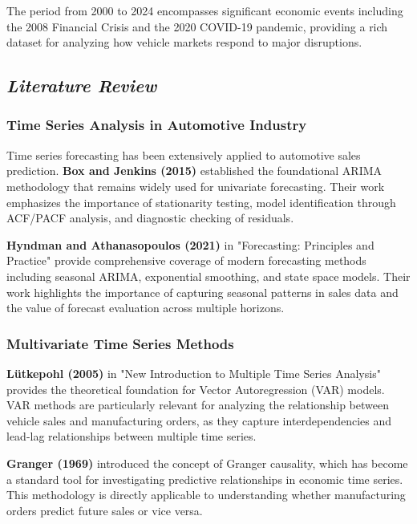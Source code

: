 \documentclass[12pt]{article}
\begin{document}
The period from 2000 to 2024 encompasses significant economic events including the 2008 Financial Crisis and the 2020 COVID-19 pandemic, providing a rich dataset for analyzing how vehicle markets respond to major disruptions.

\subsection*{\textit{Literature Review}}

\subsubsection*{Time Series Analysis in Automotive Industry}

Time series forecasting has been extensively applied to automotive sales prediction. \textbf{Box and Jenkins (2015)} established the foundational ARIMA methodology that remains widely used for univariate forecasting. Their work emphasizes the importance of stationarity testing, model identification through ACF/PACF analysis, and diagnostic checking of residuals.

\textbf{Hyndman and Athanasopoulos (2021)} in "Forecasting: Principles and Practice" provide comprehensive coverage of modern forecasting methods including seasonal ARIMA, exponential smoothing, and state space models. Their work highlights the importance of capturing seasonal patterns in sales data and the value of forecast evaluation across multiple horizons.

\subsubsection*{Multivariate Time Series Methods}

\textbf{Lütkepohl (2005)} in "New Introduction to Multiple Time Series Analysis" provides the theoretical foundation for Vector Autoregression (VAR) models. VAR methods are particularly relevant for analyzing the relationship between vehicle sales and manufacturing orders, as they capture interdependencies and lead-lag relationships between multiple time series.

\textbf{Granger (1969)} introduced the concept of Granger causality, which has become a standard tool for investigating predictive relationships in economic time series. This methodology is directly applicable to understanding whether manufacturing orders predict future sales or vice versa.
\end{document}
